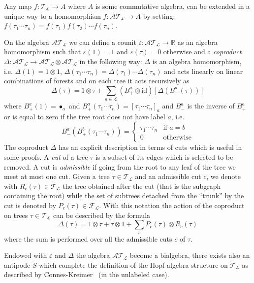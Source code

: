 \documentclass[a4paper,11pt,reqno]{article}
\newcommand{\1}{{\bf 1}}
\newcommand{\eps}{\varepsilon}
\newcommand{\RR}{\mathbb{R}}
\newcommand{\FF}{\mathcal{F}}
\newcommand{\LL}{\mathcal{L}}
\newcommand{\cl}{\mathcal L}
\newcommand{\TT}{\mathcal{T}}
\newcommand{\cA}{\mathcal{A}}
\newcommand{\troot}{\bullet}
\begin{document}
Any map $f : \TT_\cl \to
A$ where $A$ is some commutative algebra, can be extended in a unique way to
a homomorphism $f : \cA
\TT_\cl \to A$ by setting:
$
f(\tau_1 \cdots \tau_n) = f(\tau_1) f(\tau_2) \cdots  f(\tau_n)
$.

On the algebra $\cA \TT_\cl$ we can define a counit $\eps: \cA
\TT_\cl \to \RR$ as an algebra homomorphism such that $\eps(1) = 1$
and $\eps(\tau) = 0$ otherwise and a \emph{coproduct} $\Delta :
\cA\TT_\cl \to \cA\TT_\cl \otimes \cA\TT_\cl$ in the
following  way: $\Delta$ is an algebra homomorphism,
i.e. $\Delta(1) = 1 \otimes 1$, $\Delta(\tau_1 \cdots \tau_n) =
\Delta(\tau_1) \cdots \Delta(\tau_n)$ and acts linearly on linear
combinations of forests and on each tree it acts recursively as
\begin{equation}
  \label{eq:delta-def}
\Delta(\tau) = 1\otimes \tau  + \sum_{a \in \cl} (B^a_+ \otimes \text{id} )[\Delta(B^a_-(\tau))] 
\end{equation}
where $B_+^a(1) = \troot_a$ and $B_+^a(\tau_1 \cdots \tau_n) = [\tau_1 \cdots \tau_n]_a$ and
$B_-^a$ is the inverse of $B_+^a$ or is equal to zero if the tree
root does not have label $a$, i.e. 
\begin{equation*}
B_-^a(B^b_+(\tau_1 \cdots \tau_n))= \begin{cases}
 \tau_1 \cdots \tau_n & \text{if $a=b$}\\
0 & \text{otherwise}
\end{cases}
\end{equation*}
The coproduct $\Delta$ has an explicit description in terms of cuts
which is useful in some proofs. A \emph{cut} of a tree $\tau$ is a
subset of its edges which is selected to be removed. A cut is
\emph{admissible} if going from the root to any leaf of the tree we
meet at most one cut. Given a tree $\tau\in\TT_\LL$ and an admissible
cut $c$, we denote with $R_c(\tau)\in \TT_\LL$ the  tree obtained after the cut (that is the subgraph
containing the root) while the set
of subtrees detached from the ``trunk'' by the cut is denoted by
$P_c(\tau) \in \FF_\LL$. With this notation the action of the
coproduct on trees $\tau \in \TT_\LL$ can be described by the formula 
\begin{equation}
  \label{eq:copr-cuts}
  \Delta(\tau) = 1 \otimes \tau + \tau \otimes 1 + \sum_c P_c(\tau)\otimes R_c(\tau)
\end{equation}
where the sum is performed over all the admissible cuts $c$ of $\tau$.

Endowed with $\eps$ and $\Delta$ the algebra $\cA \TT_\cl$ become a
bialgebra, there exists also an antipode $S$ which complete the
definition of the Hopf algebra structure on $\TT_\cl$ as described by
Connes-Kreimer~\cite{MR1660199} (in the unlabeled case). 
\end{document}
